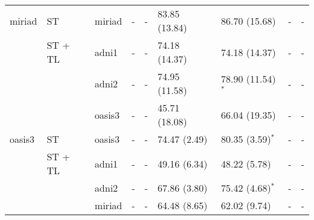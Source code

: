 \begin{table*}
{\begin{tabular}{lllllllll}
\toprule
miriad &         ST      & miriad         &              -       &             -          &  83.85 (13.84) &  86.70 (15.68)        &             - &             -         \\
\cmidrule(lr){2-9}
       &         ST + TL & adni1          &              -       &             -          &  74.18 (14.37) &  74.18 (14.37)        &             - &             -         \\
       &                 & adni2          &              -       &             -          &  74.95 (11.58) &  78.90 (11.54)$^{*}$  &             - &             -         \\
       &                 & oasis3         &              -       &             -          &  45.71 (18.08) &  66.04 (19.35)        &             - &             -         \\
\toprule
oasis3 &         ST      & oasis3         &              -       &             -          &   74.47 (2.49) &   80.35 (3.59)$^{*}$  &             - &             -         \\
\cmidrule(lr){2-9}
       &         ST + TL & adni1          &              -       &             -          &   49.16 (6.34) &   48.22 (5.78)        &             - &             -         \\
       &                 & adni2          &              -       &             -          &   67.86 (3.80) &   75.42 (4.68)$^{*}$  &             - &             -         \\
       &                 & miriad         &              -       &             -          &   64.48 (8.65) &   62.02 (9.74)        &             - &             -         \\
\bottomrule
\end{tabular}}
\end{table*}

